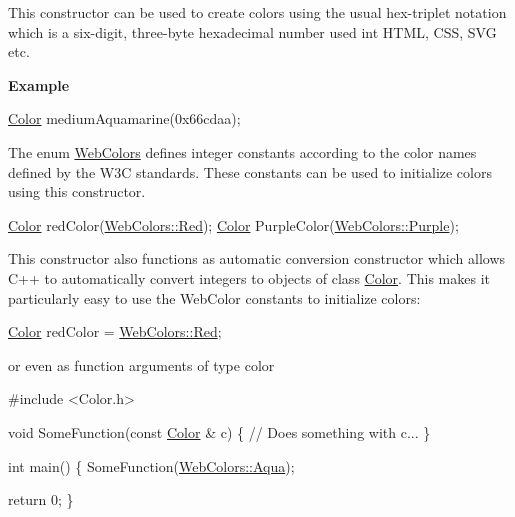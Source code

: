 This constructor can be used to create colors using the usual hex-\/triplet notation which is a six-\/digit, three-\/byte hexadecimal number used int H\+T\+ML, C\+SS, S\+VG etc.

{\bfseries Example}


\begin{DoxyCode}
\hyperlink{classastu_1_1Color_abb0e2cdad572357375d5b2465ea847b9}{Color} mediumAquamarine(0x66cdaa);
\end{DoxyCode}


The enum \hyperlink{classastu_1_1WebColors}{Web\+Colors} defines integer constants according to the color names defined by the W3C standards. These constants can be used to initialize colors using this constructor.


\begin{DoxyCode}
\hyperlink{classastu_1_1Color_abb0e2cdad572357375d5b2465ea847b9}{Color} redColor(\hyperlink{classastu_1_1WebColors_ac75482e858498b1b3fa521ba93fcda98a56bb31647b5e647e11d2941f54a30781}{WebColors::Red});
\hyperlink{classastu_1_1Color_abb0e2cdad572357375d5b2465ea847b9}{Color} PurpleColor(\hyperlink{classastu_1_1WebColors_ac75482e858498b1b3fa521ba93fcda98a3d63297abeb7cf60c2ddae0a1ee3e658}{WebColors::Purple});
\end{DoxyCode}


This constructor also functions as automatic conversion constructor which allows C++ to automatically convert integers to objects of class \hyperlink{classastu_1_1Color}{Color}. This makes it particularly easy to use the Web\+Color constants to initialize colors\+:


\begin{DoxyCode}
\hyperlink{classastu_1_1Color_abb0e2cdad572357375d5b2465ea847b9}{Color} redColor = \hyperlink{classastu_1_1WebColors_ac75482e858498b1b3fa521ba93fcda98a56bb31647b5e647e11d2941f54a30781}{WebColors::Red};
\end{DoxyCode}


or even as function arguments of type color


\begin{DoxyCode}
\textcolor{preprocessor}{#include <Color.h>}

\textcolor{keywordtype}{void} SomeFunction(\textcolor{keyword}{const} \hyperlink{classastu_1_1Color_abb0e2cdad572357375d5b2465ea847b9}{Color} & c) \{
 \textcolor{comment}{// Does something with c...}
\}

\textcolor{keywordtype}{int} main() \{
  SomeFunction(\hyperlink{classastu_1_1WebColors_ac75482e858498b1b3fa521ba93fcda98a93a4bd8dbcd8c09329c7d866c835571c}{WebColors::Aqua});

  \textcolor{keywordflow}{return} 0;
\}
\end{DoxyCode}



